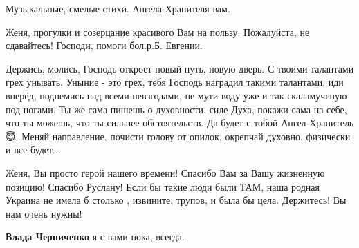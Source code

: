 \begin{itemize}
Музыкальные, смелые стихи. Ангела-Хранителя вам.

 
Женя, прогулки и созерцание красивого Вам на пользу. Пожалуйста, не сдавайтесь! Господи, помоги бол.р.Б. Евгении.

 

Держись, молись, Господь откроет новый путь, новую дверь. С твоими талантами
грех унывать. Уныние - это грех, тебя Господь наградил такими талантами, иди
вперёд, поднемись над всеми невзгодами, не мути воду уже и так скаламученую под
ногами. Ты же сама пишешь о духовности, силе Духа, покажи сама на себе, что ты
можешь, что ты сильнее обстоятельств. Да будет с тобой Ангел Хранитель 😇.
Меняй направление, почисти голову от опилок, окрепчай духовно, физически и все
будет...


 
Женя, Вы просто герой нашего времени! Спасибо Вам за Вашу жизненную позицию!
Спасибо Руслану! Если бы такие люди были ТАМ, наша родная Украина не имела б
столько , извините, трупов, и была бы цела. Держитесь! Вы нам очень нужны!

\begin{itemize}
 
\textbf{Влада Черниченко} я с вами пока, всегда.

 

\end{itemize}
\end{itemize}
